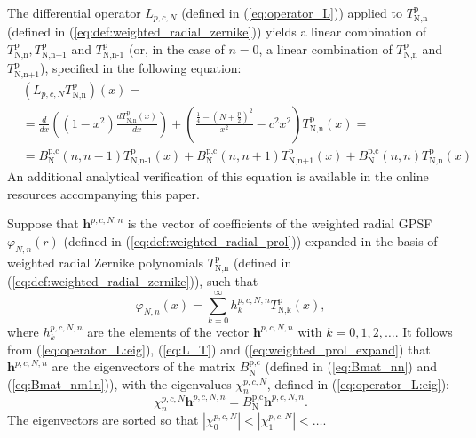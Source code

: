 \documentclass[12pt]{article}
\begin{document}
The differential operator $L_{p,c,N}$ (defined in (\ref{eq:operator_L})) applied to $T_{\text{N,n}}^{\text{p}}$ (defined in (\ref{eq:def:weighted_radial_zernike}))
yields a linear combination of $T_{\text{N,n}}^{\text{p}},T_{\text{N,n+1}}^{\text{p}}$ and $T_{\text{N,n-1}}^{\text{p}}$ (or, in the case of $n=0$, a linear combination of 
$T_{\text{N,n}}^{\text{p}}$ and $T_{\text{N,n+1}}^{\text{p}}$), specified in the following equation:
\begin{equation}\label{eq:L_T}
\begin{split}
& \left( L_{p,c,N} T_{\text{N,n}}^{\text{p}} \right)(x) = \\
& = \frac{{d} }{{d} x}\left(\left(1-x^2\right) \frac{{d} T_{\text{N,n}}^{\text{p}}(x)}{{d} x}\right)+\left(\frac{\frac{1}{4}-\left(N+\frac{p}{2}\right)^2}{x^2}-c^2 x^2\right) T_{\text{N,n}}^{\text{p}}(x) = \\
& = B_{\text{N}}^{\text{p,c}}(n,n-1) T_{\text{N,n-1}}^{\text{p}}(x)+B_{\text{N}}^{\text{p,c}}(n,n+1) T_{\text{N,n+1}}^{\text{p}}(x)+B_{\text{N}}^{\text{p,c}}(n,n) T_{\text{N,n}}^{\text{p}}(x)
\end{split}
\end{equation}
An additional analytical verification of this equation is available in the online resources accompanying this paper. 


Suppose that ${\bm h}^{p,c,N,n}$ is the vector of coefficients of the weighted radial GPSF $\varphi_{N,n}(r)$ (defined in (\ref{eq:def:weighted_radial_prol})) 
expanded in the basis of weighted radial Zernike polynomials $T_{\text{N,n}}^{\text{p}}$ (defined in (\ref{eq:def:weighted_radial_zernike})), such that 
\begin{equation}\label{eq:weighted_prol_expand}
  \varphi_{N,n}(x) = \sum_{k=0}^{\infty} {h}^{p,c,N,n}_k T_{\text{N,k}}^{\text{p}}(x) ,
\end{equation}
where ${h}^{p,c,N,n}_k$ are the elements of the vector ${\bm h}^{p,c,N,n}$ with $k=0,1,2,\ldots$.
It follows from (\ref{eq:operator_L:eig}), (\ref{eq:L_T}) and (\ref{eq:weighted_prol_expand}) that
${\bm h}^{p,c,N,n}$ are the eigenvectors of the matrix $B_{\text{N}}^{\text{p,c}}$ (defined in (\ref{eq:Bmat_nn}) and (\ref{eq:Bmat_nm1n})),
with the eigenvalues $\chi^{p,c,N}_n$, defined in (\ref{eq:operator_L:eig}):
\begin{equation}\label{eq:operator_L:eig:mat}
\chi^{p,c,N}_n {\bm h}^{p,c,N,n} = B_{\text{N}}^{\text{p,c}} {\bm h}^{p,c,N,n} .
\end{equation}
The eigenvectors are sorted so that $|\chi^{p,c,N}_0| < |\chi^{p,c,N}_1| < \ldots $.
\end{document}
